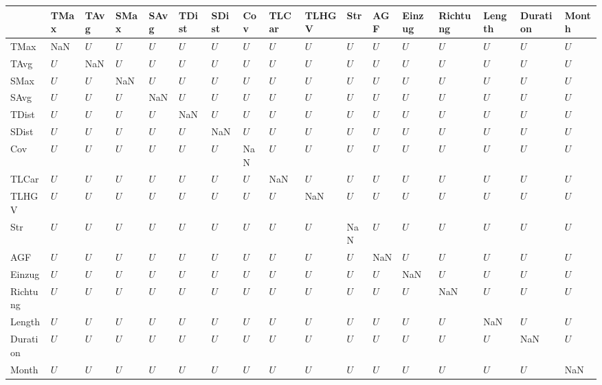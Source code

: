 \begin{tabular}{lllllllllllllllll}
\toprule
{} & TMax & TAvg & SMax & SAvg & TDist & SDist &  Cov & TLCar & TLHGV &  Str &  AGF & Einzug & Richtung & Length & Duration & Month \\
\midrule
TMax     &  NaN &  $U$ &  $U$ &  $U$ &   $U$ &   $U$ &  $U$ &   $U$ &   $U$ &  $U$ &  $U$ &    $U$ &      $U$ &    $U$ &      $U$ &   $U$ \\
TAvg     &  $U$ &  NaN &  $U$ &  $U$ &   $U$ &   $U$ &  $U$ &   $U$ &   $U$ &  $U$ &  $U$ &    $U$ &      $U$ &    $U$ &      $U$ &   $U$ \\
SMax     &  $U$ &  $U$ &  NaN &  $U$ &   $U$ &   $U$ &  $U$ &   $U$ &   $U$ &  $U$ &  $U$ &    $U$ &      $U$ &    $U$ &      $U$ &   $U$ \\
SAvg     &  $U$ &  $U$ &  $U$ &  NaN &   $U$ &   $U$ &  $U$ &   $U$ &   $U$ &  $U$ &  $U$ &    $U$ &      $U$ &    $U$ &      $U$ &   $U$ \\
TDist    &  $U$ &  $U$ &  $U$ &  $U$ &   NaN &   $U$ &  $U$ &   $U$ &   $U$ &  $U$ &  $U$ &    $U$ &      $U$ &    $U$ &      $U$ &   $U$ \\
SDist    &  $U$ &  $U$ &  $U$ &  $U$ &   $U$ &   NaN &  $U$ &   $U$ &   $U$ &  $U$ &  $U$ &    $U$ &      $U$ &    $U$ &      $U$ &   $U$ \\
Cov      &  $U$ &  $U$ &  $U$ &  $U$ &   $U$ &   $U$ &  NaN &   $U$ &   $U$ &  $U$ &  $U$ &    $U$ &      $U$ &    $U$ &      $U$ &   $U$ \\
TLCar    &  $U$ &  $U$ &  $U$ &  $U$ &   $U$ &   $U$ &  $U$ &   NaN &   $U$ &  $U$ &  $U$ &    $U$ &      $U$ &    $U$ &      $U$ &   $U$ \\
TLHGV    &  $U$ &  $U$ &  $U$ &  $U$ &   $U$ &   $U$ &  $U$ &   $U$ &   NaN &  $U$ &  $U$ &    $U$ &      $U$ &    $U$ &      $U$ &   $U$ \\
Str      &  $U$ &  $U$ &  $U$ &  $U$ &   $U$ &   $U$ &  $U$ &   $U$ &   $U$ &  NaN &  $U$ &    $U$ &      $U$ &    $U$ &      $U$ &   $U$ \\
AGF      &  $U$ &  $U$ &  $U$ &  $U$ &   $U$ &   $U$ &  $U$ &   $U$ &   $U$ &  $U$ &  NaN &    $U$ &      $U$ &    $U$ &      $U$ &   $U$ \\
Einzug   &  $U$ &  $U$ &  $U$ &  $U$ &   $U$ &   $U$ &  $U$ &   $U$ &   $U$ &  $U$ &  $U$ &    NaN &      $U$ &    $U$ &      $U$ &   $U$ \\
Richtung &  $U$ &  $U$ &  $U$ &  $U$ &   $U$ &   $U$ &  $U$ &   $U$ &   $U$ &  $U$ &  $U$ &    $U$ &      NaN &    $U$ &      $U$ &   $U$ \\
Length   &  $U$ &  $U$ &  $U$ &  $U$ &   $U$ &   $U$ &  $U$ &   $U$ &   $U$ &  $U$ &  $U$ &    $U$ &      $U$ &    NaN &      $U$ &   $U$ \\
Duration &  $U$ &  $U$ &  $U$ &  $U$ &   $U$ &   $U$ &  $U$ &   $U$ &   $U$ &  $U$ &  $U$ &    $U$ &      $U$ &    $U$ &      NaN &   $U$ \\
Month    &  $U$ &  $U$ &  $U$ &  $U$ &   $U$ &   $U$ &  $U$ &   $U$ &   $U$ &  $U$ &  $U$ &    $U$ &      $U$ &    $U$ &      $U$ &   NaN \\
\bottomrule
\end{tabular}
